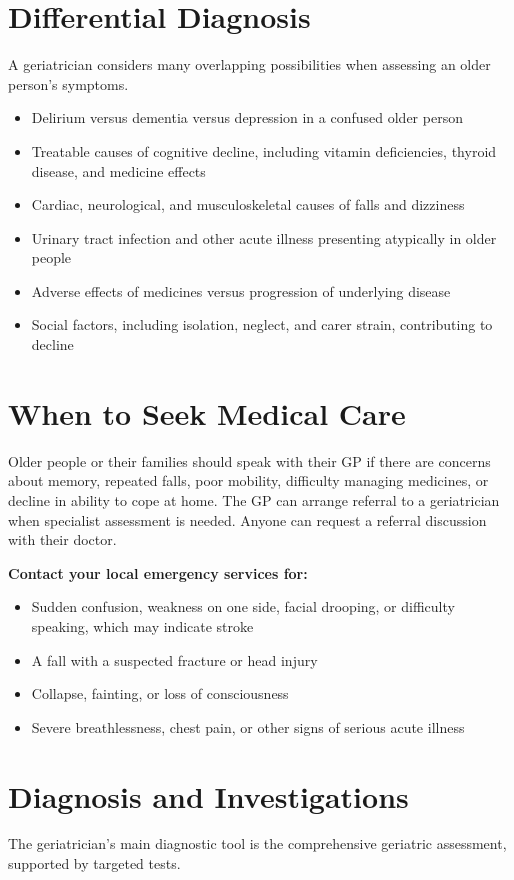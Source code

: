 \section*{Differential Diagnosis}
A geriatrician considers many overlapping possibilities when assessing an older person's symptoms.

\begin{itemize}
    \item Delirium versus dementia versus depression in a confused older person
    \item Treatable causes of cognitive decline, including vitamin deficiencies, thyroid disease, and medicine effects
    \item Cardiac, neurological, and musculoskeletal causes of falls and dizziness
    \item Urinary tract infection and other acute illness presenting atypically in older people
    \item Adverse effects of medicines versus progression of underlying disease
    \item Social factors, including isolation, neglect, and carer strain, contributing to decline
\end{itemize}

\section*{When to Seek Medical Care}
Older people or their families should speak with their GP if there are concerns about memory, repeated falls, poor mobility, difficulty managing medicines, or decline in ability to cope at home. The GP can arrange referral to a geriatrician when specialist assessment is needed. Anyone can request a referral discussion with their doctor.

\textbf{Contact your local emergency services for:}
\begin{itemize}
    \item Sudden confusion, weakness on one side, facial drooping, or difficulty speaking, which may indicate stroke
    \item A fall with a suspected fracture or head injury
    \item Collapse, fainting, or loss of consciousness
    \item Severe breathlessness, chest pain, or other signs of serious acute illness
\end{itemize}

\section*{Diagnosis and Investigations}
The geriatrician's main diagnostic tool is the comprehensive geriatric assessment, supported by targeted tests.

